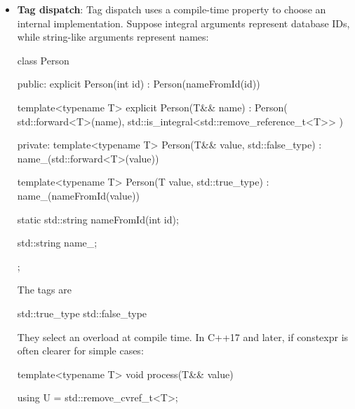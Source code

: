 \documentclass{report}
\begin{document}
\begin{itemize}
\begin{cppcode}
{            private:
                std::string name_;
            };
            \end{cppcode}
            \bigbreak \noindent 
            For an lvalue, the argument is copied into name, and then moved into name\_. For an rvalue, the parameter is constructed or moved efficiently:
            \bigbreak \noindent 
            This is particularly useful when the function needs to own a copy of the argument anyway. The tradeoff is that an lvalue may involve one copy followed by one move. For types such as std::string, the additional move is normally inexpensive.
        \item \textbf{Tag dispatch}: Tag dispatch uses a compile-time property to choose an internal implementation.
            \bigbreak \noindent 
            Suppose integral arguments represent database IDs, while string-like arguments represent names:
            \bigbreak \noindent 
            \begin{cppcode}
            class Person {
            public:
                explicit Person(int id)
                    : Person(nameFromId(id)) {}

                template<typename T>
                explicit Person(T&& name)
                    : Person(
                          std::forward<T>(name),
                          std::is_integral<std::remove_reference_t<T>>{}
                      ) {}

            private:
                template<typename T>
                Person(T&& value, std::false_type)
                    : name_(std::forward<T>(value)) {}

                template<typename T>
                Person(T value, std::true_type)
                    : name_(nameFromId(value)) {}

                static std::string nameFromId(int id);

                std::string name_;
            };
            \end{cppcode}
            \bigbreak \noindent 
            The tags are
            \bigbreak \noindent 
            \begin{cppcode}
                std::true_type
                std::false_type
            \end{cppcode}
            \bigbreak \noindent 
            They select an overload at compile time.
            \bigbreak \noindent
            In C++17 and later, if constexpr is often clearer for simple cases:
            \bigbreak \noindent 
            \begin{cppcode}
                template<typename T>
                void process(T&& value) {
                    using U = std::remove_cvref_t<T>;

}
\end{cppcode}
\end{itemize}
\end{document}
